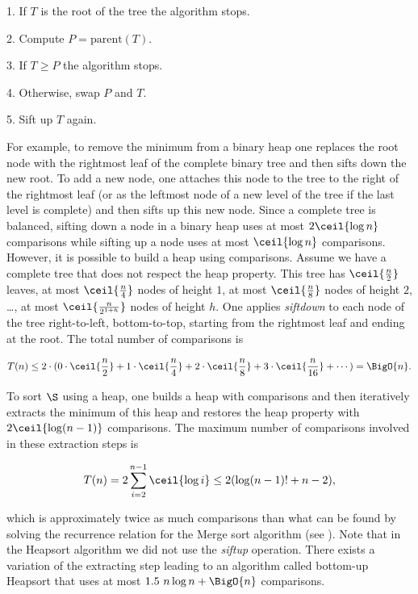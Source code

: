 \begin{algorithm}
\item[1.] If \(T\) is the root of the tree the algorithm stops.
\item[2.] Compute \(P = \text{parent}(T)\).
\item[3.] If \(T \ge P\) the algorithm stops.
\item[4.] Otherwise, swap \(P\) and \(T\).
\item[5.] Sift up \(T\) again.
\end{algorithm}

For example, to remove the minimum from a binary heap one replaces the root
node with the rightmost leaf of the complete binary tree and then sifts down
the new root. To add a new node, one attaches this node to the tree to the
right of the rightmost leaf (or as the leftmost node of a new level
of the tree if the last level is complete) and then sifts up this new node.
Since a complete tree is balanced, sifting down a node in a binary heap uses
at most \(2 \ceil{\log n}\) comparisons while sifting up a node uses at most
\(\ceil{\log n}\)
comparisons. However, it is possible to build a heap using 
comparisons. Assume we have a complete tree that does not respect the heap
property. This tree has \(\ceil{\frac{n}{2}}\) leaves, at most
\(\ceil{\frac{n}{4}}\) nodes of height \(1\), at most \(\ceil{\frac{n}{8}}\)
nodes of height \(2\), \dots, \ie at most \(\ceil{\frac{n}{2^{1+h}}}\) nodes
of height \(h\).
One applies \emph{siftdown} to each node of the tree right-to-left,
bottom-to-top, starting from the rightmost leaf and ending at the root. The
total number of comparisons is

\begin{displaymath}
T(n) \le 2 \cdot ( 0 \cdot \ceil{\frac{n}{2}} + 1 \cdot \ceil{\frac{n}{4}} + 2 \cdot
\ceil{\frac{n}{8}} + 3 \cdot \ceil{\frac{n}{16}} + \cdots ) = \BigO{n}.
\end{displaymath}

To sort \(\S\) using a heap, one builds a heap with  comparisons and
then iteratively extracts the minimum of this heap and restores the heap
property with \(2\ceil{\log (n-1)}\) comparisons. The maximum number of
comparisons involved in these extraction steps is

\begin{displaymath}
T(n) = 2 \sum_{i=2}^{n-1} \ceil{\log i} \le 2 ( \log (n-1)! + n - 2 ),
\end{displaymath}

which is approximately twice as much comparisons than what can be found by
solving the recurrence relation for the Merge sort algorithm (see
\citet*{OEIS:A001855}). Note that in the Heapsort algorithm we did not use the
\emph{siftup} operation. There exists \cite{wegener:1993} a variation of the
extracting step leading to an algorithm called bottom-up Heapsort that uses at
most \(1.5~n \log n + \BigO{n}\) comparisons.

